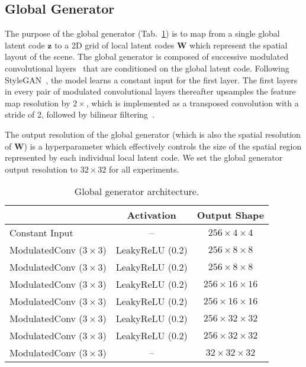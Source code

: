 \documentclass[10pt,twocolumn,letterpaper]{article}
\begin{document}
\subsection{Global Generator}

The purpose of the global generator (Tab.~\ref{tab:global_generator_architecture}) is to map from a single global latent code $\textbf{z}$ to a 2D grid of local latent codes $\textbf{W}$ which represent the spatial layout of the scene. The global generator is composed of successive modulated convolutional layers~\cite{stylegan2}
that are conditioned on the global latent code.
Following StyleGAN~\cite{stylegan}, the model learns a constant input for the first layer. The first layers in every pair of modulated convolutional layers thereafter upsamples the feature map resolution by $2\times$, which is implemented as a transposed convolution with a stride of 2, followed by bilinear filtering~\cite{blur}. 

The output resolution of the global generator (which is also the spatial resolution of $\textbf{W}$) is a hyperparameter which effectively controls the size of the spatial region represented by each individual local latent code. We set the global generator output resolution to $32\times32$ for all experiments.

\begin{table}[h]
	\small
	\centering
	\begin{tabular}{lcc}
		\toprule
		& Activation & Output Shape \\
		\midrule
		Constant Input & -- & $256 \times 4 \times 4$ \\
		ModulatedConv ($3\times3$) & LeakyReLU (0.2) & $256 \times 8 \times 8$ \\
		ModulatedConv ($3\times3$) & LeakyReLU (0.2) & $256 \times 8 \times 8$ \\
		ModulatedConv ($3\times3$) & LeakyReLU (0.2) & $256 \times 16 \times 16$ \\
		ModulatedConv ($3\times3$) & LeakyReLU (0.2) & $256 \times 16 \times 16$ \\
		ModulatedConv ($3\times3$) & LeakyReLU (0.2) & $256 \times 32 \times 32$ \\
		ModulatedConv ($3\times3$) & LeakyReLU (0.2) & $256 \times 32 \times 32$ \\
		ModulatedConv ($3\times3$) & -- & $32 \times 32 \times 32$ \\
		\bottomrule
	\end{tabular}
	\caption{Global generator architecture.}
	\label{tab:global_generator_architecture}
\end{table}
\end{document}
